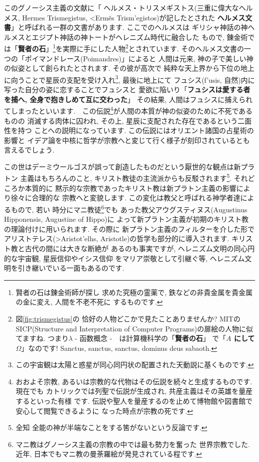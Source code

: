 \documentclass[b5j,8pt,twocolumn]{ltjsarticle}
\newcommand{\textgreek}[1]{\begingroup\fontencoding{LGR}\selectfont#1\endgroup}
\newcommand{\textgreek}[1]{\begingroup\fontencoding{LGR}\selectfont#1\endgroup}
\begin{document}
このグノーシス主義の文献に「 ヘルメス・トリスメギストス(三重に偉大なヘルメス,
 Hermes Trismegistus, \textgreek{<Erm\~es Trism'egistos})が記したとされた
\textbf{ヘルメス文書}」と呼ばれる一群の文書があります. ここでのヘルメスは
ギリシャ神話の神ヘルメスとエジプト神話の神トートがヘレニズム時代に融合した
もので, 錬金術では「\textbf{賢者の石}」\footnote{賢者の石は錬金術師が探し
求めた究極の霊薬で, 鉄などの非貴金属を貴金属の金に変え, 人間を不老不死に
するものです.}を実際に手にした人物\footnote{図\ref{fig:trismegistus}の
恰好の人物どこかで見たことありませんか? MITのSICP(Structure and
 Interpretation of Computer Programs)の扉絵の人物に似てますね.
 つまり$\lambda$ - 函数概念 -　は計算機科学の「\textbf{賢者の石}」
で「\textbf{$A$ にして $\Omega$}」なのです!
Sanctus, sanctus, sanctus, dominus deus sabaoth.}とされています\cite{錬金術}.
そのヘルメス文書の一つの「ポイマンドレース(Poimandres)」\cite{柴田}によると
人間は元来, 神の子で美しい神の似姿として創られたとされます. その彼が高次で
純粋な天上界から下位の地上に向うことで星辰の支配を受け入れ\footnote{この宇宙観は太陽と惑星が同心同円状の配置された天動説に基くものです.}, 最後に地上にて
フュシス(\textgreek{f'usis}, 自然)内に写った自分の姿に恋することでフュシスと
愛欲に陥いり「\textbf{フュシスは愛する者を捕へ, 全身で抱きしめて互に交わった}」
その結果, 人間はフュシスに捕えられてしまったといいます.　この伝説\footnote{
おおよそ宗教, あるいは宗教的な代物はその伝説を続々と生成するものです. 現在でも
カトリックでは列聖で伝説が生成され, 共産主義はその英雄を量産するといった有様
です. 伝説や聖人を量産するのを止めて博物館や図書館で安心して閲覧できるように
なった時点が宗教の死です.}が人間の本質が神の似姿のために不死であるものの
消滅する肉体に囚われ, その上, 星辰に支配された存在であるという二面性を持つ
ことへの説明になっています. この伝説にはオリエント諸国の占星術の影響と
イデア論を中核に哲学が宗教へと変じて行く様子が刻印されているとも言えるでしょう.
\newline

この世はデーミウールゴスが誤って創造したものだという厭世的な観点は新プラトン
主義はもちろんのこと, キリスト教徒の主流派からも反駁されます\footnote{全知
全能の神が半端なことをする筈がないという反論です.}. それどころか本質的に
黙示的な宗教であったキリスト教は新プラトン主義の影響により徐々に合理的な
宗教へと変貌します. この変化は教父と呼ばれる神学者達によるもので, 若い
時分にマニ教徒\footnote{マニ教はグノーシス主義の宗教の中では最も勢力を奮った
世界宗教でした. 近年, 日本でもマニ教の曼荼羅絵が発見されている程です.}でも
あった教父アウグスティヌス(Augustinus Hipponensis, Augustine of Hippo)に
よって新プラトン主義が初期のキリスト教の理論付けに用いられます. その際に
新プラトン主義のフィルターを介した形でアリストテレス(\textgreek{>Aristot'elhs},
Aristotle)の哲学も部分的に導入されます. キリスト教と古代の間には大きな断絶が
あるのも事実ですが, ヘレニズム文明の同心円的な宇宙観, 星辰信仰やイシス信仰
をマリア崇敬として引継ぐ等, ヘレニズム文明を引き継いでいる一面もあるのです.
\newline
\end{document}
